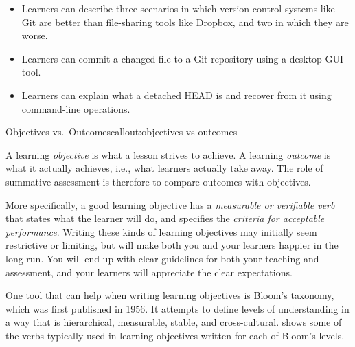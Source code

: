 \begin{itemize}

\item
  Learners can describe three scenarios in which version control
  systems like Git are better than file-sharing tools like Dropbox,
  and two in which they are worse.

\item
  Learners can commit a changed file to a Git repository using a
  desktop GUI tool.

\item
  Learners can explain what a detached HEAD is and recover from it
  using command-line operations.

\end{itemize}

\begin{callout}{Objectives vs.\ Outcomes}{callout:objectives-vs-outcomes}

A learning \emph{objective} is what a lesson strives to achieve.  A
learning \emph{outcome} is what it actually achieves, i.e., what
learners actually take away.  The role of summative assessment is
therefore to compare outcomes with objectives.

\end{callout}

More specifically, a good learning objective has a \emph{measurable or
verifiable verb} that states what the learner will do, and specifies
the \emph{criteria for acceptable performance}.  Writing these kinds
of learning objectives may initially seem restrictive or limiting, but
will make both you and your learners happier in the long run. You will
end up with clear guidelines for both your teaching and assessment,
and your learners will appreciate the clear expectations.

One tool that can help when writing learning objectives is
\href{https://en.wikipedia.org/wiki/Bloom's\_taxonomy}{Bloom's taxonomy},
which was first published in 1956.  It attempts to define levels of
understanding in a way that is hierarchical, measurable, stable, and
cross-cultural.   shows some of the verbs typically
used in learning objectives written for each of Bloom's levels.

